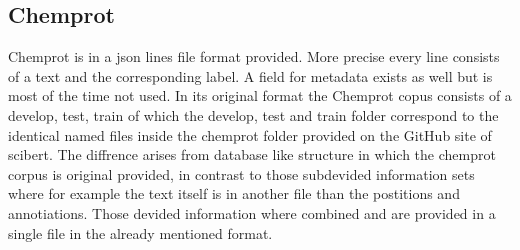 \subsection{Chemprot}
Chemprot is in a json lines file format provided. More precise every line consists of a text and the corresponding label. A field for metadata exists as well but is most of the time not used. In its original format the Chemprot copus consists of a develop, test, train of which the develop, test and train folder correspond to the identical named files inside the chemprot folder provided on the GitHub site of scibert. The diffrence arises from database like structure in which the chemprot corpus is original provided, in contrast to those subdevided information sets where for example the text itself is in another file than the postitions and annotiations. Those devided information where combined and are provided in a single file in the already mentioned format. \cite{Beltagy2019,Wang2016}